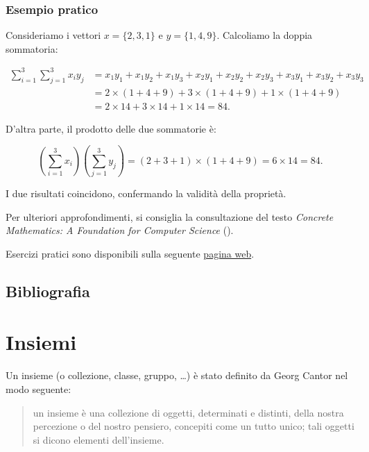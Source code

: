 \documentclass[
  italian,
  letterpaper,
  a4paper,
  11pt,
  open=any]{scrbook}
\theoremstyle{plain}
\theoremstyle{definition}
\theoremstyle{definition}
\theoremstyle{remark}
\begin{document}
\subsection{Esempio pratico}\label{esempio-pratico}

Consideriamo i vettori \(x = \{2, 3, 1\}\) e \(y = \{1, 4, 9\}\).
Calcoliamo la doppia sommatoria:

\[
\begin{aligned}
\sum_{i=1}^3 \sum_{j=1}^3 x_i y_j &= x_1 y_1 + x_1 y_2 + x_1 y_3 + x_2 y_1 + x_2 y_2 + x_2 y_3 + x_3 y_1 + x_3 y_2 + x_3 y_3 \\
&= 2 \times (1 + 4 + 9) + 3 \times (1 + 4 + 9) + 1 \times (1 + 4 + 9) \\
&= 2 \times 14 + 3 \times 14 + 1 \times 14 = 84.
\end{aligned}
\]

D'altra parte, il prodotto delle due sommatorie è:

\[
\left( \sum_{i=1}^3 x_i \right) \left( \sum_{j=1}^3 y_j \right) = (2 + 3 + 1) \times (1 + 4 + 9) = 6 \times 14 = 84.
\]

I due risultati coincidono, confermando la validità della proprietà.

Per ulteriori approfondimenti, si consiglia la consultazione del testo
\emph{Concrete Mathematics: A Foundation for Computer Science}
().

Esercizi pratici sono disponibili sulla seguente
\href{https://math.libretexts.org/Courses/Cosumnes_River_College/Math_370\%3A_Precalculus/07\%3A_Sequences_and_the_Binomial_Theorem/7.02\%3A_Summation_Notation/7.2E\%3A_Exercises}{pagina
web}.

\section*{Bibliografia}\label{bibliografia-11}


\chapter{Insiemi}\label{sec-apx-sets}

Un insieme (o collezione, classe, gruppo, \ldots) è stato definito da
Georg Cantor nel modo seguente:

\begin{quote}
un insieme è una collezione di oggetti, determinati e distinti, della
nostra percezione o del nostro pensiero, concepiti come un tutto unico;
tali oggetti si dicono elementi dell'insieme.
\end{quote}
\end{document}
